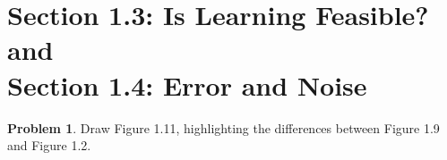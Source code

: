\documentclass[10pt]{exam}
\theoremstyle{definition}
\newtheorem{problem}{Problem}
\begin{document}
\newpage
\section{Section 1.3: Is Learning Feasible? and \\ Section 1.4: Error and Noise}

\begin{problem}
    Draw Figure 1.11, highlighting the differences between Figure 1.9 and Figure 1.2.
\end{problem}

\end{document}
